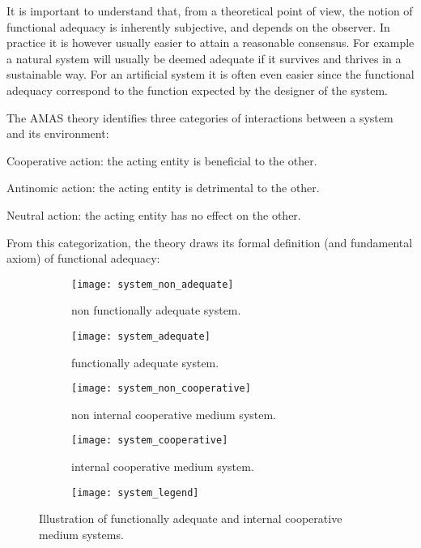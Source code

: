 It is important to understand that, from a theoretical point of view, the notion of functional adequacy is inherently subjective, and depends on the observer. In practice it is however usually easier to attain a reasonable consensus. For example a natural system will usually be deemed adequate if it survives and thrives in a sustainable way. For an artificial system it is often even easier since the functional adequacy correspond to the function expected by the designer of the system.

The AMAS theory identifies three categories of interactions between a system and its environment:
\begin{compactitem}
\item Cooperative action: the acting entity is beneficial to the other.
\item Antinomic action: the acting entity is detrimental to the other.
\item Neutral action: the acting entity has no effect on the other.
\end{compactitem}

From this categorization, the theory draws its formal definition (and fundamental axiom) of functional adequacy:


\begin{figure}
\centering

	\begin{subfigure}[b]{0.45\textwidth}
		\centering
		\texttt{[image: system\_non\_adequate]}
		\caption{non functionally adequate system.}\label{adequacy_comp_1}
	\end{subfigure}
	\begin{subfigure}[b]{0.45\textwidth}
		\centering
		\texttt{[image: system\_adequate]}
		\caption{functionally adequate system.}\label{adequacy_comp_2}
	\end{subfigure}
	
	\begin{subfigure}[b]{0.45\textwidth}
		\centering
		\texttt{[image: system\_non\_cooperative]}
		\caption{non internal cooperative medium system.}\label{internal_cooperative_comp_1}
	\end{subfigure}
	\begin{subfigure}[b]{0.45\textwidth}
		\centering
		\texttt{[image: system\_cooperative]}
		\caption{internal cooperative medium system.}\label{internal_cooperative_comp_2}
	\end{subfigure}
	
	\begin{subfigure}[b]{0.7\textwidth}
		\centering
		\texttt{[image: system\_legend]}
	\end{subfigure}
	
\caption{Illustration of functionally adequate and internal cooperative medium systems.}
\label{adequacy_comp}
\end{figure}

